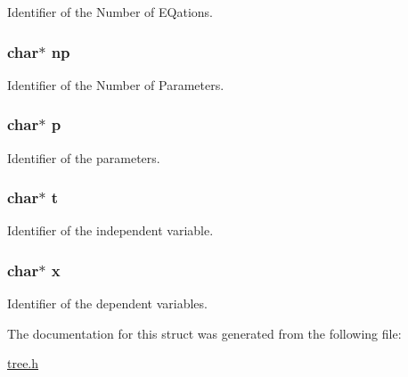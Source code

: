 Identifier of the Number of E\-Qations. 

\hypertarget{structFunction_ac5e9e8f42513fbf549dcde4107b633d0}{
\subsubsection[{np}]{\setlength{\rightskip}{0pt plus 5cm}char$\ast$ np}}\label{structFunction_ac5e9e8f42513fbf549dcde4107b633d0}


Identifier of the Number of Parameters. 

\hypertarget{structFunction_aaa1ebe818ec1c763a776cc580551f3e6}{
\subsubsection[{p}]{\setlength{\rightskip}{0pt plus 5cm}char$\ast$ p}}\label{structFunction_aaa1ebe818ec1c763a776cc580551f3e6}


Identifier of the parameters. 

\hypertarget{structFunction_a21feba301403a65090791a94f26c9d92}{
\subsubsection[{t}]{\setlength{\rightskip}{0pt plus 5cm}char$\ast$ t}}\label{structFunction_a21feba301403a65090791a94f26c9d92}


Identifier of the independent variable. 

\hypertarget{structFunction_a87d9da60be62fb1a74b56404c392bf74}{
\subsubsection[{x}]{\setlength{\rightskip}{0pt plus 5cm}char$\ast$ x}}\label{structFunction_a87d9da60be62fb1a74b56404c392bf74}


Identifier of the dependent variables. 



The documentation for this struct was generated from the following file\-:\begin{DoxyCompactItemize}
\item 
\hyperlink{tree_8h}{tree.\-h}\end{DoxyCompactItemize}
